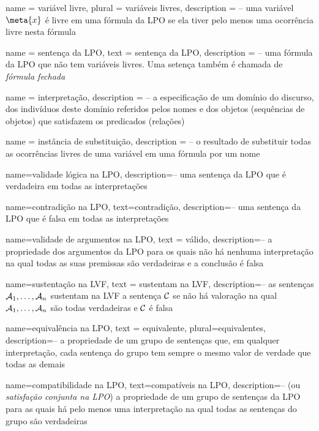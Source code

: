 {
 name = variável livre,
 plural = variáveis livres,
 description = {-- uma variável $\meta{x}$ é livre em uma fórmula da LPO se ela tiver pelo menos uma ocorrência livre nesta fórmula}
}

{
 name = sentença da LPO,
 text = sentença da LPO,
 description = {-- uma fórmula da LPO que não tem variáveis livres. Uma setença também é chamada de \textit{fórmula fechada}}
}

{
 name = {interpretação},
 description = {-- a especificação de um domínio do discurso, dos indivíduos deste domínio referidos pelos nomes e dos objetos (sequências de objetos) que satisfazem os predicados (relações)}
}

{
 name = instância de substituição,
 description = {-- o resultado de substituir todas as ocorrências livres de uma variável em uma fórmula por um nome}
}

{
 name=validade lógica na LPO,
 description={-- uma sentença da LPO que é verdadeira em todas as interpretações}
}

{
 name=contradição na LPO,
 text=contradição,
 description={--  uma sentença da LPO que é falsa em todas as interpretações}
} 

{
 name=validade de argumentos na LPO,
 text = válido,
 description={-- a propriedade dos argumentos da LPO para os quais não há nenhuma interpretação na qual todas as suas premissas são verdadeiras e a conclusão é falsa}
}

{
 name=sustentação na LVF,
 text = sustentam na LVF,
 description={-- as sentenças $\mathcal{A}_1, \ldots, \mathcal{A}_n$ sustentam na LVF a sentença $\mathcal{C}$ se não há valoração na qual $\mathcal{A}_1, \ldots, \mathcal{A}_n$ são todas verdadeiras e $\mathcal{C}$ é falsa}
}

{
 name=equivalência na LPO,
 text = equivalente,
 plural=equivalentes,
 description={-- a propriedade de um grupo de sentenças que, em qualquer interpretação, cada sentença do grupo tem sempre o mesmo valor de verdade que todas as demais}
}

{
 name=compatibilidade na LPO,
 text=compatíveis na LPO,
 description={-- (ou \textit{satisfação conjunta na LPO}) a propriedade de um grupo de sentenças da LPO para as quais há pelo menos uma interpretação na qual todas as sentenças do grupo são verdadeiras}
}

